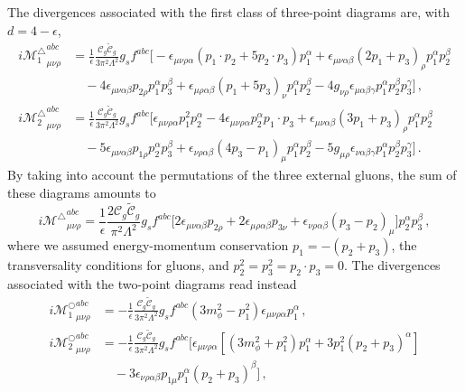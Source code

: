 The divergences associated with the first class of three-point diagrams are, with
$d=4-\epsilon$,
\begin{align}
    i {\mathcal M_{1}^\triangle}_{\mu\nu\rho}^{abc} &= \frac{1}{\epsilon}\frac{\mathcal C_g \widetilde{\mathcal C}_g}{3\pi^2 \Lambda^2}g_sf^{abc}\big[-\epsilon_{\mu\nu\rho\alpha}(p_1\cdot p_2+5p_2\cdot p_3)p_1^\alpha
    +\epsilon_{\mu\nu\alpha\beta}(2p_1+p_3)_\rho p_1^\alpha p_2^\beta \nonumber \\
    &\quad
    -4 \epsilon_{\mu\nu\alpha\beta}p_{2\rho} p_1^\alpha p_3^\beta
    + \epsilon_{\mu\rho\alpha\beta}(p_1+5p_3)_\nu p_1^\alpha p_2^\beta - 4 g_{\nu\rho}\epsilon_{\mu\alpha\beta\gamma}p_1^\alpha p_2^\beta p_3^\gamma
    \big]\,,\\
    i {\mathcal M_{2}^\triangle}_{\mu\nu\rho}^{abc} &= \frac{1}{\epsilon}\frac{\mathcal C_g \widetilde{\mathcal C}_g}{3\pi^2 \Lambda^2}g_sf^{abc}\big[
    \epsilon_{\mu\nu\rho\alpha}p_1^2 p_2^\alpha
    -4 \epsilon_{\mu\nu\rho\alpha}p_2^\alpha  p_1\cdot p_3
    + \epsilon_{\mu\nu\alpha\beta}(3p_1+p_3)_\rho p_1^\alpha p_2^\beta \nonumber \\
    &\quad
    - 5 \epsilon_{\mu\nu\alpha\beta}p_{1\rho} p_2^\alpha p_3^\beta
    +\epsilon_{\nu\rho\alpha\beta}(4p_3-p_1)_\mu p_1^\alpha p_2^\beta
    -5 g_{\mu\rho} \epsilon_{\nu\alpha\beta\gamma} p_1^\alpha p_2^\beta p_3^\gamma
    \big]\,.
\end{align}
By taking into account the permutations of the three external gluons, the sum of these diagrams
amounts to
\begin{equation}
i {\mathcal{M}^{\triangle}}_{\mu\nu\rho}^{abc} = \frac{1}{\epsilon}\frac{2\mathcal C_g \widetilde{\mathcal C}_g}{\pi^2 \Lambda^2}g_s f^{abc} \big[
2\epsilon_{\mu\nu\alpha\beta}p_{2\rho}
+ 2\epsilon_{\mu\rho\alpha\beta}p_{3\nu}
+\epsilon_{\nu\rho\alpha\beta}(p_3-p_2)_\mu
\big] p_2^\alpha p_3^\beta\,,
\end{equation}
where we assumed energy-momentum conservation $p_1 = - (p_2+p_3)$, the transversality
conditions for gluons, and $p_2^2=p_3^2=p_2\cdot p_3 = 0$.
The divergences associated with the two-point diagrams read instead
\begin{align}
    i {\mathcal M_{1}^\bigcirc}_{\mu\nu\rho}^{abc} &= -\frac{1}{\epsilon}\frac{\mathcal C_g \widetilde{\mathcal C}_g}{3\pi^2\Lambda^2}g_sf^{abc}(3m_\phi^2 -p_1^2)\epsilon_{\mu\nu\rho\alpha}p_1^\alpha \,,
    \\
    i {\mathcal M_{2}^\bigcirc}_{\mu\nu\rho}^{abc} &= -\frac{1}{\epsilon}\frac{\mathcal C_g \widetilde{\mathcal C}_g}{3\pi^2\Lambda^2}g_sf^{abc}
    \big[
    \epsilon_{\mu\nu\rho\alpha}[(3m_\phi^2+p_1^2)p_1^\alpha
    +3p_1^2 (p_2+p_3)^\alpha ]\nonumber \\
    &\quad -3\epsilon_{\nu\rho\alpha\beta}p_{1\mu}p_1^\alpha(p_2+p_3)^\beta
    \big]\,,
\end{align}
